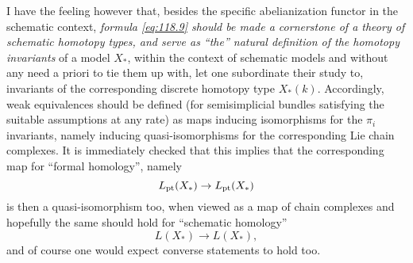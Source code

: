 I have the feeling however that, besides the specific abelianization
functor in the schematic context, \emph{formula \eqref{eq:118.9}
  should be made a cornerstone of a theory of schematic homotopy
  types, and serve as ``the'' natural definition of the homotopy
  invariants} of a model $X_*$, within the context of schematic models
and without any need a priori to tie them up with, let one subordinate
their study to, invariants of the corresponding discrete homotopy type
$X_*(k)$. Accordingly, weak equivalences should be defined (for
semisimplicial bundles satisfying the suitable assumptions at any
rate) as maps inducing isomorphisms for the $\pi_i$ invariants, namely
inducing quasi-isomorphisms for the corresponding Lie chain
complexes. It is immediately checked that this implies that the
corresponding map for ``formal homology'', namely
\[L_{\mathrm{pt}}(X_*)\to L_{\mathrm{pt}}(X_*)\]
is then a quasi-isomorphism too, when viewed as a map of chain
complexes and hopefully the same should hold for ``schematic
homology''
\[L(X_*)\to L(X_*),\]
and of course one would expect converse statements to hold too.

